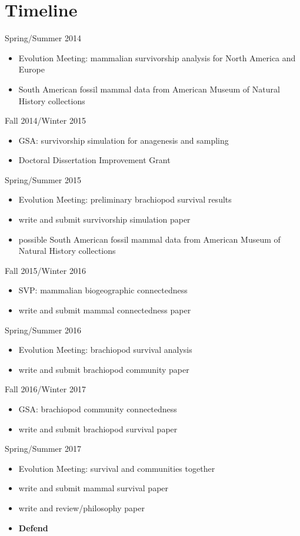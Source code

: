 \documentclass[12pt,letterpaper]{article}
\begin{document}
\clearpage

\section{Timeline}

Spring/Summer 2014
\begin{itemize}
  \item Evolution Meeting: mammalian survivorship analysis for North America and Europe
  \item South American fossil mammal data from American Museum of Natural History collections
\end{itemize}

Fall 2014/Winter 2015
\begin{itemize}
  \item GSA: survivorship simulation for anagenesis and sampling
  \item Doctoral Dissertation Improvement Grant
\end{itemize}

Spring/Summer 2015
\begin{itemize}
  \item Evolution Meeting: preliminary brachiopod survival results
  \item write and submit survivorship simulation paper
  \item possible South American fossil mammal data from American Museum of Natural History collections
\end{itemize}

Fall 2015/Winter 2016
\begin{itemize}
  \item SVP: mammalian biogeographic connectedness
  \item write and submit mammal connectedness paper
\end{itemize}

Spring/Summer 2016
\begin{itemize}
  \item Evolution Meeting: brachiopod survival analysis
  \item write and submit brachiopod community paper
\end{itemize}

Fall 2016/Winter 2017
\begin{itemize}
  \item GSA: brachiopod community connectedness
  \item write and submit brachiopod survival paper
\end{itemize}

Spring/Summer 2017
\begin{itemize}
  \item Evolution Meeting: survival and communities together
  \item write and submit mammal survival paper
  \item write and review/philosophy paper
  \item \textbf{Defend}
\end{itemize}

\clearpage


\end{document}
